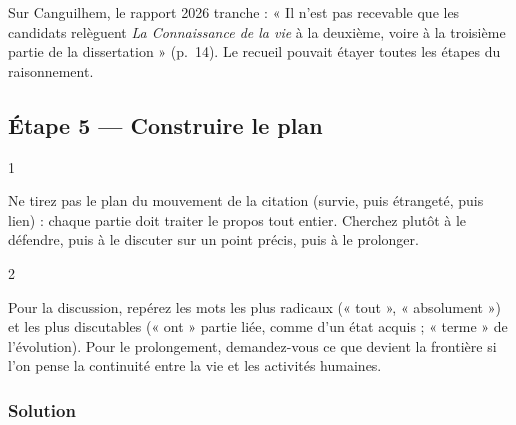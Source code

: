 \documentclass[11pt,a4paper]{article}
\begin{document}
\begin{jury}

Sur Canguilhem, le rapport 2026 tranche : « Il n'est pas recevable que les candidats relèguent \emph{La Connaissance de la vie} à la deuxième, voire à la troisième partie de la dissertation » (p.~14). Le recueil pouvait étayer toutes les étapes du raisonnement.

\end{jury}

\hypertarget{uxe9tape-5-construire-le-plan}{%
\subsection{Étape 5 --- Construire le plan}\label{uxe9tape-5-construire-le-plan}}

\begin{indication}{1}

Ne tirez pas le plan du mouvement de la citation (survie, puis étrangeté, puis lien) : chaque partie doit traiter le propos tout entier. Cherchez plutôt à le défendre, puis à le discuter sur un point précis, puis à le prolonger.

\end{indication}

\begin{indication}{2}

Pour la discussion, repérez les mots les plus radicaux (« tout », « absolument ») et les plus discutables (« ont » partie liée, comme d'un état acquis ; « terme » de l'évolution). Pour le prolongement, demandez-vous ce que devient la frontière si l'on pense la continuité entre la vie et les activités humaines.

\end{indication}

\hypertarget{solution-4}{%
\subsubsection{Solution}\label{solution-4}}
\end{document}
